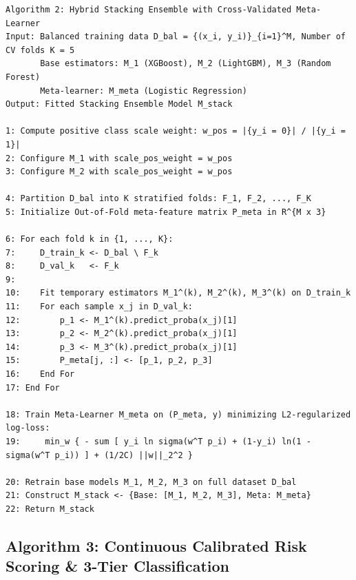 \documentclass[12pt,a4paper,oneside]{report}
\begin{document}
\begin{lstlisting}
Algorithm 2: Hybrid Stacking Ensemble with Cross-Validated Meta-Learner
Input: Balanced training data D_bal = {(x_i, y_i)}_{i=1}^M, Number of CV folds K = 5
       Base estimators: M_1 (XGBoost), M_2 (LightGBM), M_3 (Random Forest)
       Meta-learner: M_meta (Logistic Regression)
Output: Fitted Stacking Ensemble Model M_stack

1: Compute positive class scale weight: w_pos = |{y_i = 0}| / |{y_i = 1}|
2: Configure M_1 with scale_pos_weight = w_pos
3: Configure M_2 with scale_pos_weight = w_pos

4: Partition D_bal into K stratified folds: F_1, F_2, ..., F_K
5: Initialize Out-of-Fold meta-feature matrix P_meta in R^{M x 3}

6: For each fold k in {1, ..., K}:
7:     D_train_k <- D_bal \ F_k
8:     D_val_k   <- F_k
9:     
10:    Fit temporary estimators M_1^(k), M_2^(k), M_3^(k) on D_train_k
11:    For each sample x_j in D_val_k:
12:        p_1 <- M_1^(k).predict_proba(x_j)[1]
13:        p_2 <- M_2^(k).predict_proba(x_j)[1]
14:        p_3 <- M_3^(k).predict_proba(x_j)[1]
15:        P_meta[j, :] <- [p_1, p_2, p_3]
16:    End For
17: End For

18: Train Meta-Learner M_meta on (P_meta, y) minimizing L2-regularized log-loss:
19:     min_w { - sum [ y_i ln sigma(w^T p_i) + (1-y_i) ln(1 - sigma(w^T p_i)) ] + (1/2C) ||w||_2^2 }

20: Retrain base models M_1, M_2, M_3 on full dataset D_bal
21: Construct M_stack <- {Base: [M_1, M_2, M_3], Meta: M_meta}
22: Return M_stack
\end{lstlisting}


\subsection{Algorithm 3: Continuous Calibrated Risk Scoring \& 3-Tier Classification}
\end{document}
